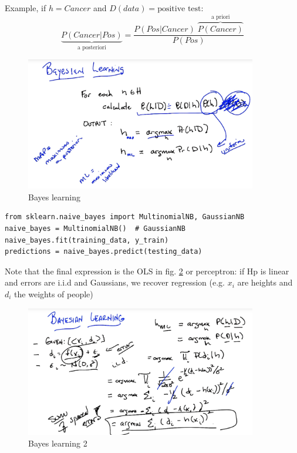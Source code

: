 \documentclass[11pt]{article}
\begin{document}
Example, if $h = Cancer$ and $D (data) = \text{positive test}$:
\[ \underbrace{P(Cancer|Pos)}_{\text{a posteriori}} = \frac{ P(Pos|Cancer) \; \overbrace{P(Cancer)}^{\text{a priori}} }{P(Pos)} 
\]
\begin{figure}[htbp] 
	\centering
	\includegraphics[width=0.9\textwidth]{pics/bayesian_learning}
	\caption{Bayes learning} 
	\label{bayesian_learning}
\end{figure}


\begin{lstlisting}
from sklearn.naive_bayes import MultinomialNB, GaussianNB
naive_bayes = MultinomialNB()  # GaussianNB
naive_bayes.fit(training_data, y_train)
predictions = naive_bayes.predict(testing_data)
\end{lstlisting}


Note that the final expression is the OLS in fig. \ref{bayesian_learning2} or perceptron: if Hp is linear and errors are i.i.d and Gaussians, we recover regression (e.g. $x_i$ are heights and $d_i$ the weights of people)

\begin{figure}[htbp] 
	\centering
	\includegraphics[width=0.9\textwidth]{pics/bayesian_learning_2}
	\caption{Bayes learning 2} 
	\label{bayesian_learning2}
\end{figure}
\end{document}
